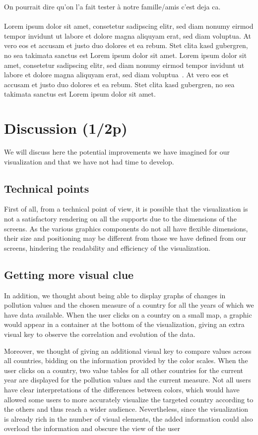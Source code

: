 \documentclass[preprint,journal]{vgtc}       %
\begin{document}
	On pourrait dire qu'on l'a fait tester à notre famille/amis c'est deja ca.\\
	~\\
	Lorem ipsum dolor sit amet, consetetur sadipscing elitr, sed diam
	nonumy eirmod tempor invidunt ut labore et dolore magna aliquyam erat,
	sed diam voluptua. At vero eos et accusam et justo duo dolores et ea
	rebum. Stet clita kasd gubergren, no sea takimata sanctus est Lorem
	ipsum dolor sit amet. Lorem ipsum dolor sit amet, consetetur
	sadipscing elitr, sed diam nonumy eirmod tempor invidunt ut labore et
	dolore magna aliquyam erat, sed diam
	voluptua~\cite{Kitware:2003,Max:1995:OMF}. At vero eos et accusam et
	justo duo dolores et ea rebum. Stet clita kasd gubergren, no sea
	takimata sanctus est Lorem ipsum dolor sit amet. 

\section{Discussion (1/2p)}

We will discuss here the potential improvements we have imagined for our visualization and that we have not had time to develop. 

\subsection{Technical points}
First of all, from a technical point of view, it is possible that the visualization is not a satisfactory rendering on all the supports due to the dimensions of the screens. As the various graphics components do not all have flexible dimensions, their size and positioning may be different from those we have defined from our screens, hindering the readability and efficiency of the visualization. 


\subsection{Getting more visual clue}
In addition, we thought about being able to display graphs of changes in pollution values ​​and the chosen measure of a country for all the years of which we have data available. When the user clicks on a country on a small map, a graphic would appear in a container at the bottom of the visualization, giving an extra visual key to observe the correlation and evolution of the data. 

Moreover, we thought of giving an additional visual key to compare values ​​across all countries, bidding on the information provided by the color scales. When the user clicks on a country, two value tables for all other countries for the current year are displayed for the pollution values ​​and the current measure. Not all users have clear interpretations of the differences between colors, which would have allowed some users to more accurately visualize the targeted country according to the others and thus reach a wider audience. Nevertheless, since the visualization is already rich in the number of visual elements, the added information could also overload the information and obscure the view of the user
\end{document}
